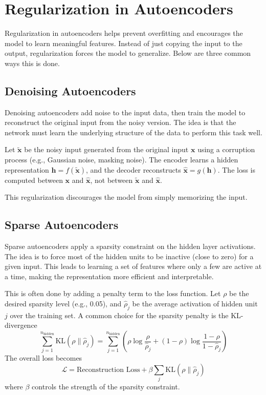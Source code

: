 \section{Regularization in Autoencoders}

Regularization in autoencoders helps prevent overfitting and encourages the model to learn meaningful features. Instead of just copying the input to the output, regularization forces the model to generalize. Below are three common ways this is done.

\subsection{Denoising Autoencoders}

Denoising autoencoders add noise to the input data, then train the model to reconstruct the original input from the noisy version. The idea is that the network must learn the underlying structure of the data to perform this task well.

Let \( \tilde{\mathbf{x}} \) be the noisy input generated from the original input \( \mathbf{x} \) using a corruption process (e.g., Gaussian noise, masking noise). The encoder learns a hidden representation \( \mathbf{h} = f(\tilde{\mathbf{x}}) \), and the decoder reconstructs \( \mathbf{\hat{x}} = g(\mathbf{h}) \). The loss is computed between \( \mathbf{x} \) and \( \mathbf{\hat{x}} \), not between \( \tilde{\mathbf{x}} \) and \( \mathbf{\hat{x}} \). 

This regularization discourages the model from simply memorizing the input.

\subsection{Sparse Autoencoders}

Sparse autoencoders apply a sparsity constraint on the hidden layer activations. The idea is to force most of the hidden units to be inactive (close to zero) for a given input. This leads to learning a set of features where only a few are active at a time, making the representation more efficient and interpretable.

This is often done by adding a penalty term to the loss function. Let \( \rho \) be the desired sparsity level (e.g., 0.05), and \( \hat{\rho}_j \) be the average activation of hidden unit \( j \) over the training set. A common choice for the sparsity penalty is the KL-divergence
\[
\sum_{j=1}^{n_{\text{hidden}}} \text{KL}(\rho \| \hat{\rho}_j) = \sum_{j=1}^{n_{\text{hidden}}} \left( \rho \log \frac{\rho}{\hat{\rho}_j} + (1 - \rho) \log \frac{1 - \rho}{1 - \hat{\rho}_j} \right)
\]
The overall loss becomes
\[
\mathcal{L} = \text{Reconstruction Loss} + \beta \sum_{j} \text{KL}(\rho \| \hat{\rho}_j)
\]
where \( \beta \) controls the strength of the sparsity constraint.

